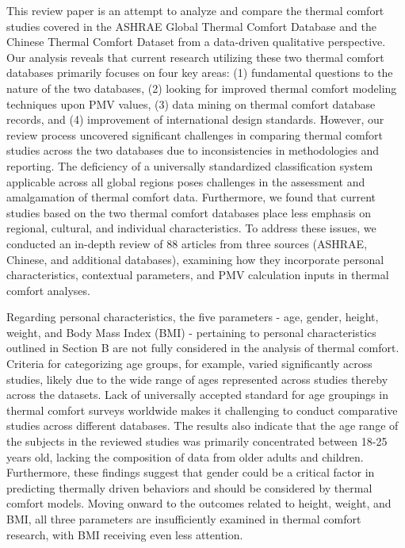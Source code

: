 \documentclass[final,3p,times,12pt]{elsarticle}
\begin{document}
This review paper is an attempt to analyze and compare the thermal comfort studies covered in the ASHRAE Global Thermal Comfort Database and the Chinese Thermal Comfort Dataset from a data-driven qualitative perspective. Our analysis reveals that current research utilizing these two thermal comfort databases primarily focuses on four key areas: 
(1) fundamental questions to the nature of the two databases, 
(2) looking for improved thermal comfort modeling techniques upon PMV values, 
(3) data mining on thermal comfort database records, and
(4) improvement of international design standards.
However, our review process uncovered significant challenges in comparing thermal comfort studies across the two databases due to inconsistencies in methodologies and reporting.
The deficiency of a universally standardized classification system applicable across all global regions poses challenges in the assessment and amalgamation of thermal comfort data. Furthermore, we found that current studies based on the two thermal comfort databases place less emphasis on regional, cultural, and individual characteristics. 
To address these issues, we conducted an in-depth review of 88 articles from three sources (ASHRAE, Chinese, and additional databases), examining how they incorporate personal characteristics, contextual parameters, and PMV calculation inputs in thermal comfort analyses.


Regarding personal characteristics, the five parameters - age, gender, height, weight, and Body Mass Index (BMI) - pertaining to personal characteristics outlined in Section B are not fully considered in the analysis of thermal comfort. 
Criteria for categorizing age groups, for example, varied significantly across studies, likely due to the wide range of ages represented across studies thereby across the datasets.
Lack of universally accepted standard for age groupings in thermal comfort surveys worldwide makes it challenging to conduct comparative studies across different databases.
The results also indicate that the age range of the subjects in the reviewed studies was primarily concentrated between 18-25 years old, lacking the composition of data from older adults and children. 
Furthermore, these findings suggest that gender could be a critical factor in predicting thermally driven behaviors and should be considered by thermal comfort models.
Moving onward to the outcomes related to height, weight, and BMI, all three parameters are insufficiently examined in thermal comfort research, with BMI receiving even less attention.
\end{document}
